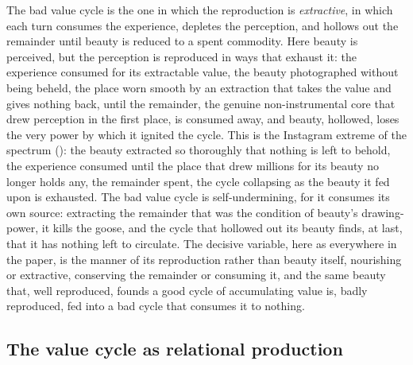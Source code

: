 The bad value cycle is the one in which the reproduction is \emph{extractive}, in which each turn consumes the experience, depletes the perception, and hollows out the remainder until beauty is reduced to a spent commodity. Here beauty is perceived, but the perception is reproduced in ways that exhaust it: the experience consumed for its extractable value, the beauty photographed without being beheld, the place worn smooth by an extraction that takes the value and gives nothing back, until the remainder, the genuine non-instrumental core that drew perception in the first place, is consumed away, and beauty, hollowed, loses the very power by which it ignited the cycle. This is the Instagram extreme of the spectrum (): the beauty extracted so thoroughly that nothing is left to behold, the experience consumed until the place that drew millions for its beauty no longer holds any, the remainder spent, the cycle collapsing as the beauty it fed upon is exhausted. The bad value cycle is self-undermining, for it consumes its own source: extracting the remainder that was the condition of beauty's drawing-power, it kills the goose, and the cycle that hollowed out its beauty finds, at last, that it has nothing left to circulate. The decisive variable, here as everywhere in the paper, is the manner of its reproduction rather than beauty itself, nourishing or extractive, conserving the remainder or consuming it, and the same beauty that, well reproduced, founds a good cycle of accumulating value is, badly reproduced, fed into a bad cycle that consumes it to nothing.

\subsection{The value cycle as relational production}
\label{p21:sub:pe-cyclerelational}

